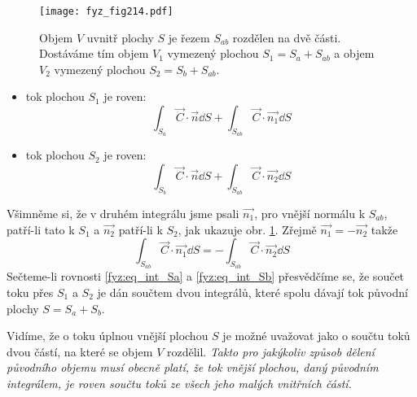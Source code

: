     \begin{figure}[ht!]
      \centering
      \texttt{[image: fyz\_fig214.pdf]}
      \caption{Objem $V$ uvnitř plochy $S$ je řezem $S_{ab}$ rozdělen na dvě části. Dostáváme tím
               objem $V_1$ vymezený plochou $S_1=S_a+S_{ab}$ a objem $V_2$ vymezený plochou
               $S_2=S_b+S_{ab}$.}
      \label{fyz:fig214}
    \end{figure}
    
    \begin{itemize}
      \item tok plochou $S_1$ je roven:
        \begin{equation}\label{fyz:eq_int_Sa}
           \int_{S_a}\vec{C}\cdot\vec{n}\dd{S} + \int_{S_{ab}}\vec{C}\cdot\vec{n_1}\dd{S}
        \end{equation}
      \item tok plochou $S_2$ je roven:
         \begin{equation}\label{fyz:eq_int_Sb}
           \int_{S_b}\vec{C}\cdot\vec{n}\dd{S} + \int_{S_{ab}}\vec{C}\cdot\vec{n_2}\dd{S}
        \end{equation}
    \end{itemize} 
    Všimněme si, že v druhém integrálu jsme psali $\vec{n_1}$, pro vnější normálu k $S_{ab}$, 
    patří-li tato k $S_1$ a $\vec{n_2}$ patří-li k $S_2$, jak ukazuje obr. \ref{fyz:fig214}. 
    Zřejmě $\vec{n_1}= -\vec{n_2}$ takže
    \begin{equation}
    \int_{S_{ab}}\vec{C}\cdot\vec{n_1}\dd{S} = - \int_{S_{ab}}\vec{C}\cdot\vec{n_2}\dd{S}
    \end{equation}
    Sečteme-li rovnosti \ref{fyz:eq_int_Sa} a \ref{fyz:eq_int_Sb} přesvědčíme se, že součet toku 
    přes $S_1$ a $S_2$ je dán součtem dvou integrálů, které spolu dávají tok původní plochy $S = 
    S_a + S_b$.
    
    Vidíme, že o toku úplnou vnější plochou $S$ je možné uvažovat jako o součtu toků dvou částí, na 
    které se objem $V$ rozdělil. \emph{Takto pro jakýkoliv způsob dělení původního objemu musí 
    obecně platí, že tok vnější plochou, daný původním integrálem, je roven součtu toků ze všech 
    jeho malých vnitřních částí.} 
    
